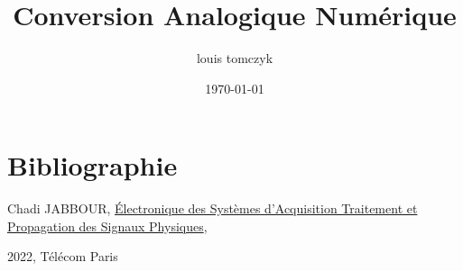 \documentclass{article}
\title{Conversion Analogique Numérique}
\author{louis tomczyk}
\date{\today\\ \ccbyncsa}
\begin{document}
\maketitle
\tableofcontents


\section{Bibliographie}
Chadi JABBOUR,
\underline{Électronique des Systèmes d’Acquisition Traitement et Propagation des Signaux Physiques},

2022, Télécom Paris



\end{document}
